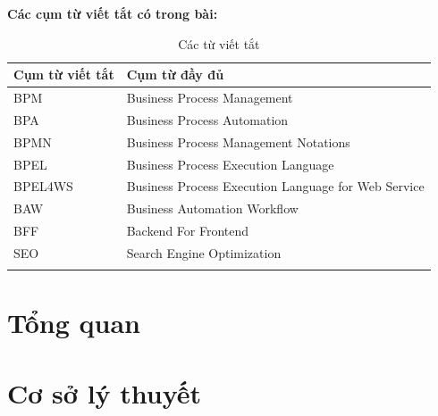 \documentclass[a4paper, oneside, 12pt]{report}
\theoremstyle{definition}
\begin{document}
\setlength{\parskip}{0mm}
{
	\pagestyle{plain}
	\tableofcontents
	\clearpage
}
\newpage
{
	\pagestyle{plain}
	\listoffigures
	\clearpage
}

\newpage

{
	\pagestyle{plain}
	\listoftables
	\clearpage
}

\newpage
\textbf{Các cụm từ viết tắt có trong bài:}
{
	\setlength\extrarowheight{6pt}
	\begin{longtable}{| p{4cm} | p{11cm} |}

		\hline
		\textbf{Cụm từ viết tắt} & \textbf{Cụm từ đầy đủ}                              \\
		\hline
		BPM                      & Business Process Management                         \\
		\hline
		BPA                      & Business Process Automation                         \\
		\hline
		BPMN                     & Business Process Management Notations               \\
		\hline
		BPEL                     & Business Process Execution Language                 \\
		\hline
		BPEL4WS                  & Business Process Execution Language for Web Service \\
		\hline
		BAW                      & Business Automation Workflow                        \\
		\hline
		BFF                      & Backend For Frontend                                \\
		\hline
		SEO                      & Search Engine Optimization                          \\
		\hline
		\caption{Các từ viết tắt}
	\end{longtable}

}


\chapter{Tổng quan}



\chapter{Cơ sở lý thuyết}

\end{document}
